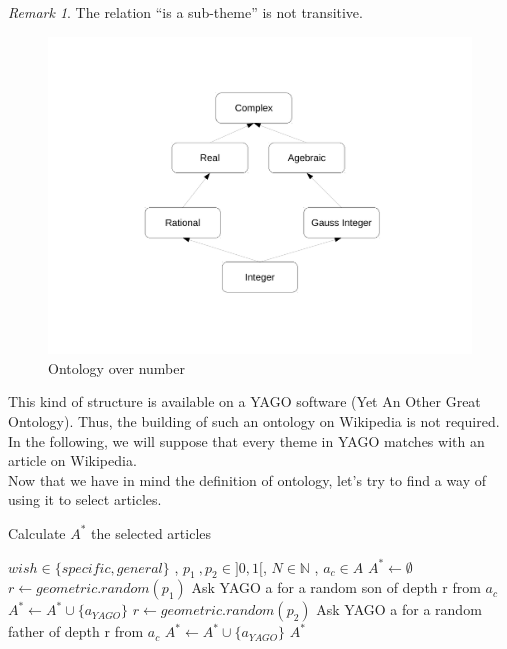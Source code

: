 \documentclass[11pt]{article}
\theoremstyle{plain}
\theoremstyle{definition}
\theoremstyle{remark}
\newtheorem*{rem}{Remark}
\begin{document}
\vspace*{5mm}

\begin{rem}
  The relation ``is a sub-theme'' is not transitive.
\end{rem}

\begin{figure}[!h]
	\centering
    \includegraphics[scale = 0.3]{ExOntology.pdf}
    \caption{Ontology over number}
\end{figure}

This kind of structure is available on a YAGO software (Yet An Other Great Ontology). Thus, the building of such an ontology on Wikipedia is not required. In the following, we will suppose that every theme in YAGO matches with an article on Wikipedia. \\
Now that we have in mind the definition of ontology, let's try to find a way of using it to select articles.\\


\begin{algorithm}
  \caption{Calculate $A^*$ the selected articles}
  \begin{algorithmic}
    \REQUIRE $wish \in \{specific , general\}$ , $p_1 \: ,p_2 \in ]0,1[ $, $N \in \mathbb{N}$ , $a_c \in A$
    \STATE $A^* \leftarrow \emptyset$
    \STATE $ r \leftarrow geometric.random(p_1)$
    \STATE Ask YAGO a for a random son of depth r from $a_c$
    \STATE $ A^* \leftarrow A^* \cup \{a_{YAGO}\}$
    \ELSE
    \STATE $ r \leftarrow geometric.random(p_2)$
    \STATE Ask YAGO a for a random father of depth r from $a_c$
    \STATE $ A^*  \leftarrow A^* \cup \{a_{YAGO}\}$ 
    \ENDIF
    \ENDWHILE
    \RETURN $A^*$
  \end{algorithmic}
\end{algorithm}
\end{document}

